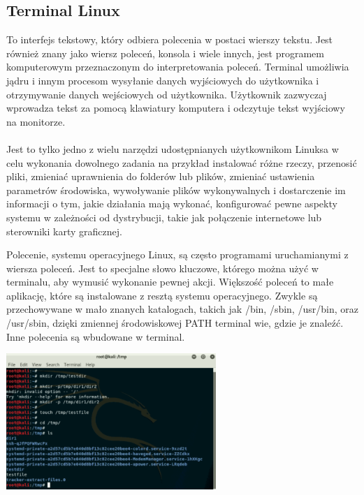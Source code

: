 \documentclass[10pt,a4paper]{report}
\begin{document}
\begin{adjustwidth}{2cm}{2cm}
\section{Terminal Linux}
\begin{minipage}{1\linewidth}
To interfejs tekstowy, który odbiera polecenia w postaci wierszy tekstu. Jest również znany jako  wiersz poleceń, konsola i wiele innych, jest programem komputerowym przeznaczonym do interpretowania poleceń. Terminal umożliwia jądru i innym procesom wysyłanie danych wyjściowych do użytkownika i otrzymywanie danych wejściowych od użytkownika. Użytkownik zazwyczaj wprowadza tekst za pomocą klawiatury komputera i odczytuje tekst wyjściowy na monitorze. \\ \\
Jest to tylko jedno z wielu narzędzi udostępnianych użytkownikom Linuksa w celu wykonania
dowolnego zadania na przykład instalować różne rzeczy, przenosić pliki, zmieniać uprawnienia do folderów lub plików, zmieniać ustawienia parametrów środowiska, wywoływanie plików wykonywalnych i dostarczenie im informacji o tym, jakie działania mają wykonać, konfigurować pewne aspekty systemu w zależności od dystrybucji, takie jak połączenie internetowe lub sterowniki karty graficznej.
\end{minipage}
\begin{minipage}{1\linewidth}
Polecenie, systemu operacyjnego Linux, są często programami uruchamianymi z wiersza poleceń. Jest to specjalne słowo kluczowe, którego można użyć w terminalu, aby wymusić wykonanie pewnej akcji. Większość poleceń to małe aplikację, które są instalowane z resztą systemu operacyjnego. Zwykle są przechowywane w mało znanych katalogach, takich jak /bin, /sbin, /usr/bin, oraz /usr/sbin, dzięki zmiennej środowiskowej PATH terminal wie, gdzie je znaleźć. Inne polecenia są wbudowane w terminal. \\
\end{minipage}
 \begin{minipage}{\linewidth}
\begin{center}
  \includegraphics[width=300px]{img/terminal}
\end{center}
\end{minipage}

\end{adjustwidth}
\end{document}

